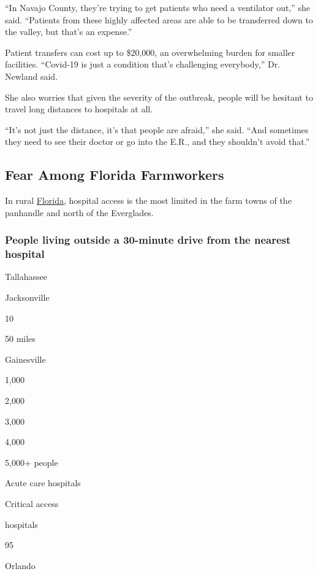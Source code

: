``In Navajo County, they're trying to get patients who need a ventilator
out,'' she said. ``Patients from these highly affected areas are able to
be transferred down to the valley, but that's an expense.''

Patient transfers can cost up to \$20,000, an overwhelming burden for
smaller facilities. ``Covid-19 is just a condition that's challenging
everybody,'' Dr. Newland said.

She also worries that given the severity of the outbreak, people will be
hesitant to travel long distances to hospitals at all.

``It's not just the distance, it's that people are afraid,'' she said.
``And sometimes they need to see their doctor or go into the E.R., and
they shouldn't avoid that.''

\hypertarget{fear-among-florida-farmworkers}{%
\subsection{Fear Among Florida
Farmworkers}\label{fear-among-florida-farmworkers}}

In rural
\href{https://www.nytimes3xbfgragh.onion/interactive/2020/us/florida-coronavirus-cases.html}{Florida},
hospital access is the most limited in the farm towns of the panhandle
and north of the Everglades.

\hypertarget{people-living-outside-a-30-minute-drive-from-the-nearest-hospital-2}{%
\subsubsection{People living outside a 30-minute drive from the nearest
hospital}\label{people-living-outside-a-30-minute-drive-from-the-nearest-hospital-2}}

Tallahassee

Jacksonville

10

50 miles

Gainesville

1,000

2,000

3,000

4,000

5,000+ people

Acute care hospitals

Critical access

hospitals

95

Orlando

